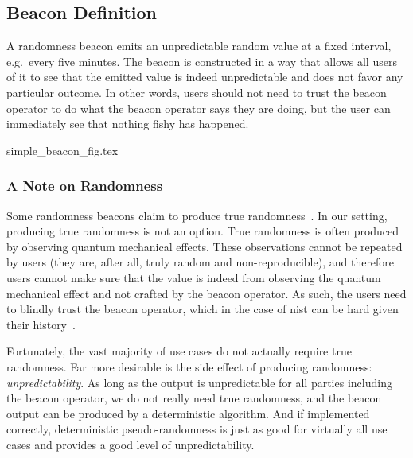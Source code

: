 


\subsection{Beacon Definition}

A randomness beacon emits an unpredictable random value at a fixed interval, e.g.\ every five minutes.
The beacon is constructed in a way that allows all users of it to see that the emitted value is indeed unpredictable and does not favor any particular outcome.
In other words, users should not need to trust the beacon operator to do what the beacon operator says they are doing, but the user can immediately see that nothing fishy has happened.

{simple_beacon_fig.tex}

\subsubsection{A Note on Randomness}
Some randomness beacons claim to produce true randomness~\cite{nistbeacon}.
In our setting, producing true randomness is not an option.
True randomness is often produced by observing quantum mechanical effects.
These observations cannot be repeated by users (they are, after all, truly random and non-reproducible), and therefore users cannot make sure that the value is indeed from observing the quantum mechanical effect and not crafted by the beacon operator.
As such, the users need to blindly trust the beacon operator, which in the case of \gls{nist} can be hard given their history~\cite{nytimes-nsabackdoors, nytimes-nsaconstants, nist2014backdoor}.

Fortunately, the vast majority of use cases do not actually require true randomness.
Far more desirable is the side effect of producing randomness: \emph{unpredictability}.
As long as the output is unpredictable for all parties including the beacon operator, we do not really need true randomness, and the beacon output can be produced by a deterministic algorithm.
And if implemented correctly, deterministic pseudo-randomness is just as good for virtually all use cases and provides a good level of unpredictability.

